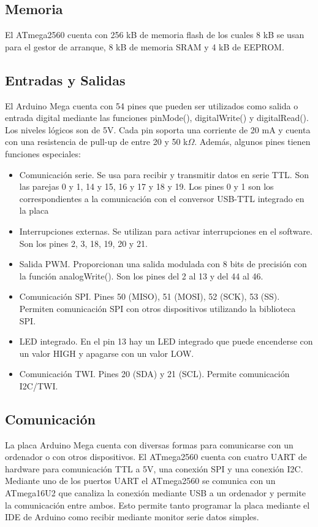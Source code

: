 \subsection{Memoria}

El ATmega2560 cuenta con 256 kB de memoria flash de los cuales 8 kB se usan para el gestor de arranque,
8 kB de memoria SRAM y 4 kB de EEPROM.

\subsection{Entradas y Salidas}

El Arduino Mega cuenta con 54 pines que pueden ser utilizados como salida o entrada digital mediante
las funciones pinMode(), digitalWrite() y digitalRead(). Los niveles lógicos son de 5V. Cada pin soporta
una corriente de 20 mA y cuenta con una resistencia de pull-up de entre 20 y 50 k$\Omega$. Además, algunos pines
tienen funciones especiales:

\begin{itemize}
    \item Comunicación serie. Se usa para recibir y transmitir datos en serie TTL. Son las parejas 0 y 1,
    14 y 15, 16 y 17 y 18 y 19. Los pines 0 y 1 son los correspondientes a la comunicación con el conversor 
    USB-TTL integrado en la placa
    \item Interrupciones externas. Se utilizan para activar interrupciones en el software. Son los pines 2, 3, 18, 19, 20 y 21.
    \item Salida PWM. Proporcionan una salida modulada con 8 bits de precisión con la función analogWrite(). Son los pines del 
    2 al 13 y del 44 al 46.
    \item Comunicación SPI. Pines 50 (MISO), 51 (MOSI), 52 (SCK), 53 (SS). Permiten comunicación SPI con otros 
    dispositivos utilizando la biblioteca SPI.
    \item LED integrado. En el pin 13 hay un LED integrado que puede encenderse con un valor HIGH y apagarse con un valor LOW.
    \item Comunicación TWI. Pines 20 (SDA) y 21 (SCL). Permite comunicación I2C/TWI.
\end{itemize}

\subsection{Comunicación}

La placa Arduino Mega cuenta con diversas formas para comunicarse con un ordenador o con otros dispositivos. El ATmega2560
cuenta con cuatro UART de hardware para comunicación TTL a 5V, una conexión SPI y una conexión I2C. Mediante uno de los puertos
UART el ATmega2560 se comunica con un ATmega16U2 que canaliza la conexión mediante USB a un ordenador y permite la comunicación
entre ambos. Esto permite tanto programar la placa mediante el IDE de Arduino como recibir mediante monitor serie datos simples.


